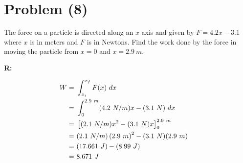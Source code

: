 \section{Problem (8)}
	The force on a particle is directed along an $x$ axis and given by $F = 4.2x - 3.1$ where $x$ is in meters and $F$ is in Newtons. Find the work done by the force in moving the particle from $x = 0$ and $x = 2.9 \ m$.

	\textbf{R:}

	\begin{align}
		W = \ &\int_{x_{i}}^{x_{f}} F(x) \ dx& \notag \\
		= \ &\int_{0}^{2.9 \ m} (4.2 \ N/m)x - (3.1 \ N) \ dx& \notag \\
		= \ &\left[(2.1 \ N/m)x^{2} - (3.1 \ N)x\right]_{0}^{2.9 \ m}& \notag \\
		= \ &(2.1 \ N/m)\left(2.9 \ m\right)^{2} - (3.1 \ N)(2.9 \ m)& \notag \\
		= \ &(17.661 \ J) - (8.99 \ J)& \notag \\
		= \ &8.671 \ J&
	\end{align}
